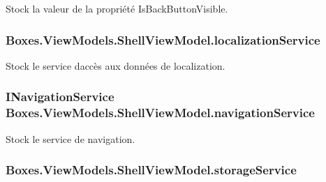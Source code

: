 Stock la valeur de la propriété {\ttfamily Is\+Back\+Button\+Visible}. 

\subsubsection[{\texorpdfstring{localization\+Service}{localizationService}}]{ Boxes.\+View\+Models.\+Shell\+View\+Model.\+localization\+Service\hspace{0.3cm}{\ttfamily [private]}}\hypertarget{class_boxes_1_1_view_models_1_1_shell_view_model_affb3ef1bb3aec55f80714a2fa4fd79a1}{}\label{class_boxes_1_1_view_models_1_1_shell_view_model_affb3ef1bb3aec55f80714a2fa4fd79a1}


Stock le service d\textquotesingle{}accès aux données de localization. 

\subsubsection[{\texorpdfstring{navigation\+Service}{navigationService}}]{\setlength{\rightskip}{0pt plus 5cm}I\+Navigation\+Service Boxes.\+View\+Models.\+Shell\+View\+Model.\+navigation\+Service\hspace{0.3cm}{\ttfamily [private]}}\hypertarget{class_boxes_1_1_view_models_1_1_shell_view_model_a6d3eb71e962c5743cbe88c6965bb0d56}{}\label{class_boxes_1_1_view_models_1_1_shell_view_model_a6d3eb71e962c5743cbe88c6965bb0d56}


Stock le service de navigation. 

\subsubsection[{\texorpdfstring{storage\+Service}{storageService}}]{ Boxes.\+View\+Models.\+Shell\+View\+Model.\+storage\+Service\hspace{0.3cm}{\ttfamily [private]}}\hypertarget{class_boxes_1_1_view_models_1_1_shell_view_model_a8be9f33243fd2a7427d2d36f1276d3a5}{}\label{class_boxes_1_1_view_models_1_1_shell_view_model_a8be9f33243fd2a7427d2d36f1276d3a5}


